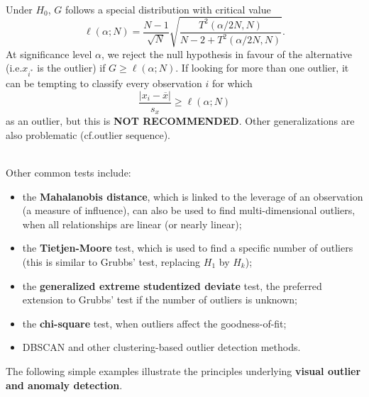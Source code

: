 \documentclass[20pt,landscape,footrule,headrule]{foils}
\newcommand{\newl}{\newline\newline}
\def\fh{\foilhead}
\begin{document}
\newpage\ \\ \noindent Under $H_0$, $G$ follows a special distribution with critical value $$\ell(\alpha;N)=\frac{N-1}{\sqrt{N}}\sqrt{\frac{T^2(\alpha/2N,N)}{N-2+T^2(\alpha/2N,N)}}.$$ 
At significance level $\alpha$, we reject the null hypothesis in favour of the alternative (i.e.\@ $x_{i^*}$ is the outlier) if  $G\geq \ell(\alpha;N)$.
\newl If looking for more than one outlier, it can be tempting to classify every observation $i$ for which 
$$\frac{|x_i-\overline{x}|}{s_x} \geq \ell(\alpha;N)$$ as an outlier, but this is \textbf{NOT RECOMMENDED}. 
\newl Other generalizations are also problematic (cf.\@ outlier sequence). 

\newpage\ \\ \noindent Other common tests include:
\begin{itemize}

\item the \textbf{Mahalanobis distance}, which is linked to the leverage of an observation (a measure of influence), can also be used to find multi-dimen\-sio\-nal outliers, when all relationships are linear (or nearly linear);

\item the \textbf{Tietjen-Moore} test, which is used to find a specific number of outliers (this is similar to Grubbs' test, replacing $H_1$ by $H_k$);

\item the \textbf{generalized extreme studentized deviate} test, the preferred extension to Grubbs' test if the number of outliers is unknown; 

\item the \textbf{chi-square} test, when outliers affect the goodness-of-fit;

\item DBSCAN and other clustering-based outlier detection methods.

\end{itemize}



\fh{Visual Outlier Detection} 
\normalsize
\noindent The following simple examples illustrate the principles underlying \textbf{visual outlier and anomaly detection}. 
\end{document}
